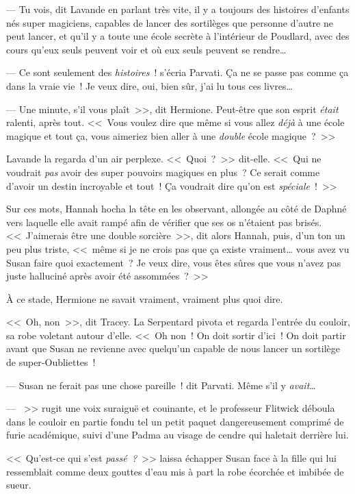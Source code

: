 --- Tu vois, dit Lavande en parlant très vite, il y a toujours des histoires d'enfants nés super magiciens, capables de lancer des sortilèges que personne d'autre ne peut lancer, et qu'il y a toute une école secrète à l'intérieur de Poudlard, avec des cours qu'eux seuls peuvent voir et où eux seuls peuvent se rendre…

--- Ce sont seulement des \emph{histoires}~! s'écria Parvati. Ça ne se passe pas comme ça dans la vraie vie~! Je veux dire, oui, bien sûr, j'ai lu tous ces livres…

--- Une minute, s'il vous plaît~>>, dit Hermione. Peut-être que son esprit \emph{était} ralenti, après tout. <<~Vous voulez dire que même si vous allez \emph{déjà} à une école magique et tout ça, vous aimeriez bien aller à une \emph{double} école magique~?~>>

Lavande la regarda d'un air perplexe. <<~Quoi~?~>> dit-elle. <<~Qui ne voudrait \emph{pas} avoir des super pouvoirs magiques en plus~? Ce serait comme d'avoir un destin incroyable et tout~! Ça voudrait dire qu'on est \emph{spéciale}~!~>>

Sur ces mots, Hannah hocha la tête en les observant, allongée au côté de Daphné vers laquelle elle avait rampé afin de vérifier que ses os n'étaient pas brisés. <<~J'aimerais être une double sorcière~>>, dit alors Hannah, puis, d'un ton un peu plus triste, <<~même si je ne crois pas que ça existe vraiment… vous avez vu Susan faire quoi exactement~? Je veux dire, vous êtes sûres que vous n'avez pas juste halluciné après avoir été assommées~?~>>

À ce stade, Hermione ne savait vraiment, vraiment plus quoi dire.

<<~Oh, non~>>, dit Tracey. La Serpentard pivota et regarda l'entrée du couloir, sa robe voletant autour d'elle. <<~Oh non~! On doit sortir d'ici~! On doit partir avant que Susan ne revienne avec quelqu'un capable de nous lancer un sortilège de super-Oubliettes~!

--- Susan ne ferait pas une chose pareille~! dit Parvati. Même s'il y \emph{avait}…

--- ~>> rugit une voix suraiguë et couinante, et le professeur Flitwick déboula dans le couloir en partie fondu tel un petit paquet dangereusement comprimé de furie académique, suivi d'une Padma au visage de cendre qui haletait derrière lui.

\later

<<~Qu'est-ce qui s'est \emph{passé~?}~>> laissa échapper Susan face à la fille qui lui ressemblait comme deux gouttes d'eau mis à part la robe écorchée et imbibée de sueur.

